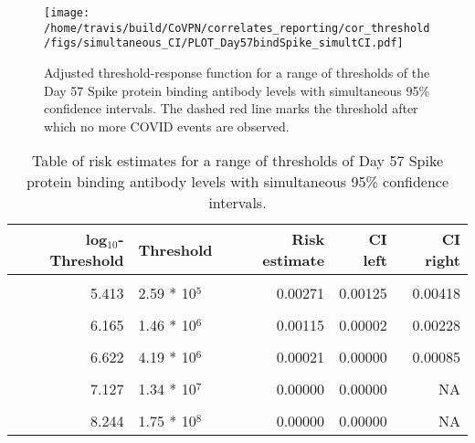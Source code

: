 \documentclass[]{book}
\theoremstyle{definition}
\theoremstyle{definition}
\theoremstyle{definition}
\newcommand{\1}{\mathbbm{1}}
\begin{document}
\begin{figure}[H]
\centering
\texttt{[image: /home/travis/build/CoVPN/correlates\_reporting/cor\_threshold/figs/simultaneous\_CI/PLOT\_Day57bindSpike\_simultCI.pdf]}
\caption{Adjusted threshold-response function for a range of thresholds of the
  Day 57 Spike protein binding antibody levels with simultaneous 95\% confidence intervals. The dashed red line marks the threshold after which no more COVID events are observed. }
\end{figure}
\begin{table}[!h]

\caption{\label{tab:unnamed-chunk-379}Table of risk estimates for a range of thresholds of Day 57 Spike protein binding antibody levels with simultaneous 95\% confidence intervals.}
\centering
\begin{tabular}[t]{rlrrr}
\toprule
log$_{10}$-Threshold & Threshold & Risk estimate & CI left & CI right\\
\midrule
\cellcolor{gray!6}{4.536} & \cellcolor{gray!6}{3.44 * 10$^4$} & \cellcolor{gray!6}{0.00480} & \cellcolor{gray!6}{0.00289} & \cellcolor{gray!6}{0.00671}\\
5.413 & 2.59 * 10$^5$ & 0.00271 & 0.00125 & 0.00418\\
\cellcolor{gray!6}{5.797} & \cellcolor{gray!6}{6.27 * 10$^5$} & \cellcolor{gray!6}{0.00172} & \cellcolor{gray!6}{0.00049} & \cellcolor{gray!6}{0.00296}\\
6.165 & 1.46 * 10$^6$ & 0.00115 & 0.00002 & 0.00228\\
\cellcolor{gray!6}{6.405} & \cellcolor{gray!6}{2.54 * 10$^6$} & \cellcolor{gray!6}{0.00079} & \cellcolor{gray!6}{0.00000} & \cellcolor{gray!6}{0.00185}\\
6.622 & 4.19 * 10$^6$ & 0.00021 & 0.00000 & 0.00085\\
\cellcolor{gray!6}{6.820} & \cellcolor{gray!6}{6.61 * 10$^6$} & \cellcolor{gray!6}{0.00028} & \cellcolor{gray!6}{0.00000} & \cellcolor{gray!6}{0.00116}\\
7.127 & 1.34 * 10$^7$ & 0.00000 & 0.00000 & NA\\
\cellcolor{gray!6}{7.409} & \cellcolor{gray!6}{2.56 * 10$^7$} & \cellcolor{gray!6}{0.00000} & \cellcolor{gray!6}{0.00000} & \cellcolor{gray!6}{NA}\\
8.244 & 1.75 * 10$^8$ & 0.00000 & 0.00000 & NA\\
\bottomrule
\end{tabular}
\end{table}
\end{document}
